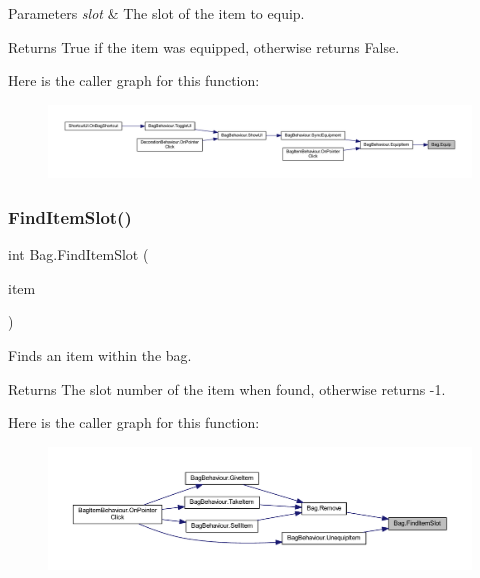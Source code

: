 \begin{DoxyParams}{Parameters}
{\em slot} & The slot of the item to equip.\\
\hline
\end{DoxyParams}
\begin{DoxyReturn}{Returns}
True if the item was equipped, otherwise returns False.
\end{DoxyReturn}
Here is the caller graph for this function\+:
\nopagebreak
\begin{figure}[H]
\begin{center}
\leavevmode
\includegraphics[width=350pt]{class_bag_a975e4ef7a5647327225e5b587b32c066_icgraph}
\end{center}
\end{figure}
\mbox{\label{class_bag_a0f77c6c4e4e4782d81256fa81e7d18f4}} 
\subsubsection{\texorpdfstring{FindItemSlot()}{FindItemSlot()}}
{\footnotesize\ttfamily int Bag.\+Find\+Item\+Slot (\begin{DoxyParamCaption}\item[{\mbox{\hyperlink{class_base_item}{Base\+Item}}}]{item }\end{DoxyParamCaption})}



Finds an item within the bag. 

\begin{DoxyReturn}{Returns}
The slot number of the item when found, otherwise returns -\/1.
\end{DoxyReturn}
Here is the caller graph for this function\+:
\nopagebreak
\begin{figure}[H]
\begin{center}
\leavevmode
\includegraphics[width=350pt]{class_bag_a0f77c6c4e4e4782d81256fa81e7d18f4_icgraph}
\end{center}
\end{figure}
\mbox{\label{class_bag_a089ef28af0c9fe39cc430b1826a313a7}} 
